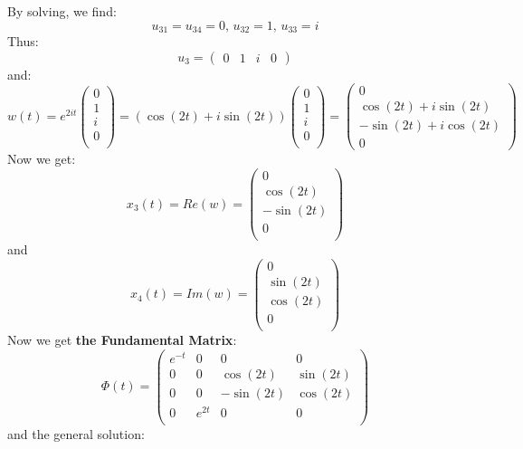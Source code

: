 \documentclass{article}
\begin{document}
By solving, we find:
$$u_{31} = u_{34} = 0, \, u_{32} = 1, \, u_{33} = i$$
Thus:
$$u_{3} = 
\begin{pmatrix}
    0 & 1 & i & 0
\end{pmatrix}$$
and:
$$w(t) = e^{2it} 
\begin{pmatrix}
    0 \\
    1 \\
    i \\
    0 \\
\end{pmatrix} =
(\cos(2t)+i\sin(2t))
\begin{pmatrix}
    0 \\
    1 \\
    i \\
    0 \\
\end{pmatrix} =
\begin{pmatrix}
    0 \\
    \cos(2t)+i\sin(2t) \\
    -\sin(2t)+i\cos(2t) \\
    0
\end{pmatrix}$$
Now we get:
$$x_{3}(t) = Re(w) = 
\begin{pmatrix}
    0 \\
    \cos(2t) \\
    -\sin(2t) \\
    0 \\
\end{pmatrix}$$
and 
$$x_{4}(t) = Im(w) =
\begin{pmatrix}
    0 \\
    \sin(2t) \\
    \cos(2t) \\
    0 \\
\end{pmatrix}$$
Now we get \textbf{the Fundamental Matrix}:
$$\Phi(t) = 
\begin{pmatrix}
    e^{-t} & 0 & 0 & 0 \\
    0 & 0 & \cos(2t) & \sin(2t) \\
    0 & 0 & -\sin(2t) & \cos(2t) \\
    0 & e^{2t} & 0 & 0 \\
\end{pmatrix}$$
and the general solution:
\end{document}
